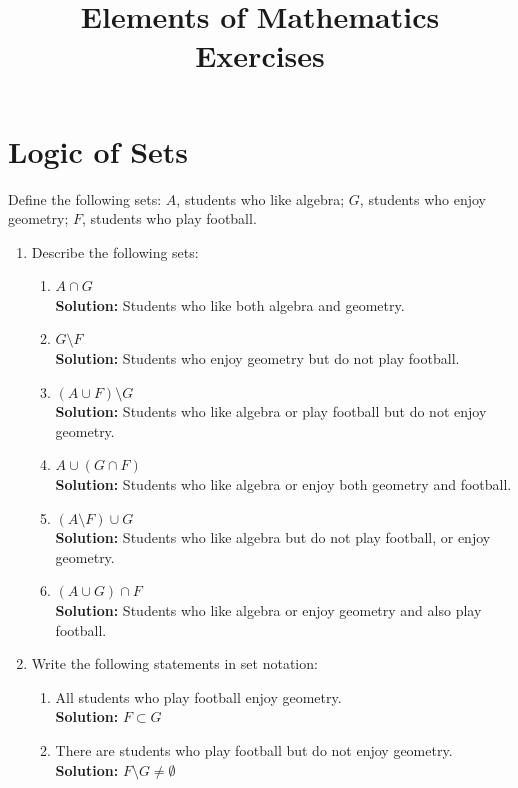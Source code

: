 \documentclass{article}
\title{Elements of Mathematics \\ Exercises}
\author{}
\date{}
\begin{document}
\maketitle
\vspace{-1.5cm}

\section{Logic of Sets}

Define the following sets: $A$, students who like algebra; $G$, students who enjoy geometry; $F$, students who play football. 

\begin{enumerate}
    \item Describe the following sets:
    \begin{enumerate}[leftmargin = 0.5cm, label = (\alph*), rightmargin = 0.2cm]
        \item \( A \cap G \) \\ \textbf{Solution:} Students who like both algebra and geometry.
        \item \( G \setminus F \) \\ \textbf{Solution:} Students who enjoy geometry but do not play football.
        \item \( (A \cup F) \setminus G \) \\ \textbf{Solution:} Students who like algebra or play football but do not enjoy geometry.
        \item \( A \cup (G \cap F) \) \\ \textbf{Solution:} Students who like algebra or enjoy both geometry and football.
        \item \( (A \setminus F) \cup G \) \\ \textbf{Solution:} Students who like algebra but do not play football, or enjoy geometry.
        \item \( (A \cup G) \cap F \) \\ \textbf{Solution:} Students who like algebra or enjoy geometry and also play football.
    \end{enumerate}
    \item Write the following statements in set notation:
    \begin{enumerate}[leftmargin = 0.5cm, label = (\alph*), rightmargin = 0.2cm]
    \item All students who play football enjoy geometry. \\ \textbf{Solution:} \( F \subset G \)
    \item There are students who play football but do not enjoy geometry. \\ \textbf{Solution:} \( F \setminus G \neq \emptyset \)

\end{enumerate}
\end{enumerate}
\end{document}
